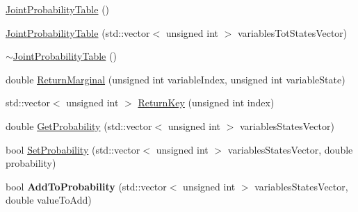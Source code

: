 \begin{DoxyCompactItemize}
\item 
\hyperlink{classbayonet_1_1_joint_probability_table_abc02930b72bf85bde3981e422e8676e0}{Joint\-Probability\-Table} ()
\item 
\hyperlink{classbayonet_1_1_joint_probability_table_afedab5cdff76623e341a9e8075a5867b}{Joint\-Probability\-Table} (std\-::vector$<$ unsigned int $>$ variables\-Tot\-States\-Vector)
\item 
\hyperlink{classbayonet_1_1_joint_probability_table_a5abe5ffb7ad2b6c4525e58b8ed6d7595}{$\sim$\-Joint\-Probability\-Table} ()
\item 
double \hyperlink{classbayonet_1_1_joint_probability_table_a90538c4bf67f0270b705caa26fea742b}{Return\-Marginal} (unsigned int variable\-Index, unsigned int variable\-State)
\item 
std\-::vector$<$ unsigned int $>$ \hyperlink{classbayonet_1_1_joint_probability_table_a0bcd0ebffb4d8fd6403759c55de62f9b}{Return\-Key} (unsigned int index)
\item 
double \hyperlink{classbayonet_1_1_joint_probability_table_a6b43b8414444f81a8013d34837d191af}{Get\-Probability} (std\-::vector$<$ unsigned int $>$ variables\-States\-Vector)
\item 
bool \hyperlink{classbayonet_1_1_joint_probability_table_a69554f2b857ee778d2d2aff7cefa0d1e}{Set\-Probability} (std\-::vector$<$ unsigned int $>$ variables\-States\-Vector, double probability)
\item 
\hypertarget{classbayonet_1_1_joint_probability_table_a1968a96a22b64477b05f1118a6f8ac32}{bool {\bfseries Add\-To\-Probability} (std\-::vector$<$ unsigned int $>$ variables\-States\-Vector, double value\-To\-Add)}\label{classbayonet_1_1_joint_probability_table_a1968a96a22b64477b05f1118a6f8ac32}


\end{DoxyCompactItemize}
